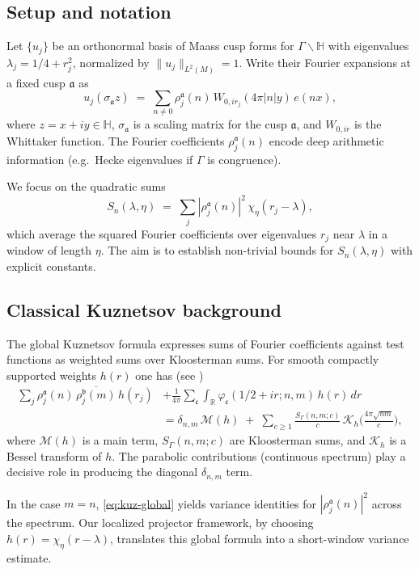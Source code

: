 \subsection{Setup and notation}
Let $\{u_j\}$ be an orthonormal basis of Maass cusp forms for $\Gamma\backslash\mathbb{H}$ with eigenvalues $\lambda_j=1/4+r_j^2$, normalized by $\|u_j\|_{L^2(M)}=1$. Write their Fourier expansions at a fixed cusp $\mathfrak{a}$ as
\begin{equation}\label{eq:fourier-expansion}
u_j(\sigma_\mathfrak{a} z)\;=\;\sum_{n\neq 0} \rho_j^\mathfrak{a}(n)\, W_{0,ir_j}(4\pi |n| y)\,e(nx),
\end{equation}
where $z=x+iy\in\mathbb{H}$, $\sigma_\mathfrak{a}$ is a scaling matrix for the cusp $\mathfrak{a}$, and $W_{0,ir}$ is the Whittaker function. The Fourier coefficients $\rho_j^\mathfrak{a}(n)$ encode deep arithmetic information (e.g.\ Hecke eigenvalues if $\Gamma$ is congruence).

We focus on the quadratic sums
\[
S_n(\lambda,\eta)\;=\;\sum_j |\rho_j^\mathfrak{a}(n)|^2 \,\chi_\eta(r_j-\lambda),
\]
which average the squared Fourier coefficients over eigenvalues $r_j$ near $\lambda$ in a window of length $\eta$. The aim is to establish non-trivial bounds for $S_n(\lambda,\eta)$ with explicit constants.

\subsection{Classical Kuznetsov background}
The global Kuznetsov formula expresses sums of Fourier coefficients against test functions as weighted sums over Kloosterman sums. For smooth compactly supported weights $h(r)$ one has (see \cite{Iwaniec2002, KowalskiMichelVanderKam2002})
\begin{align}\label{eq:kuz-global}
\sum_j \rho_j^\mathfrak{a}(n)\,\overline{\rho_j^\mathfrak{b}(m)}\, h(r_j)
&+\frac{1}{4\pi}\sum_\mathfrak{c} \int_{\mathbb{R}}
\varphi_\mathfrak{c}(1/2+ir;n,m)\, h(r)\,dr \\
&= \delta_{n,m}\,\mathcal{M}(h)\;+\;\sum_{c\ge 1} \frac{S_\Gamma(n,m;c)}{c}\,\mathcal{K}_h\!\Big(\frac{4\pi\sqrt{nm}}{c}\Big), \nonumber
\end{align}
where $\mathcal{M}(h)$ is a main term, $S_\Gamma(n,m;c)$ are Kloosterman sums, and $\mathcal{K}_h$ is a Bessel transform of $h$. The parabolic contributions (continuous spectrum) play a decisive role in producing the diagonal $\delta_{n,m}$ term.

In the case $m=n$, \eqref{eq:kuz-global} yields variance identities for $|\rho_j^\mathfrak{a}(n)|^2$ across the spectrum. Our localized projector framework, by choosing $h(r)=\chi_\eta(r-\lambda)$, translates this global formula into a short-window variance estimate.

